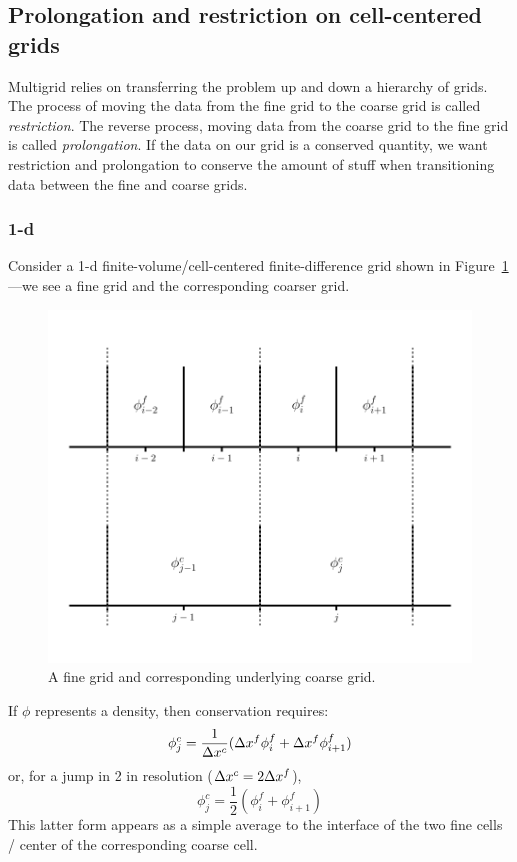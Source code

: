 \subsection{Prolongation and restriction on cell-centered grids}

Multigrid relies on transferring the problem up and down a hierarchy of
grids. 
The process of moving the data from the fine grid to the coarse grid
is called {\em restriction}.  The reverse process, moving data from
the coarse grid to the fine grid is called {\em prolongation}.  If the
data on our grid is a conserved quantity, we want restriction and prolongation to
conserve the amount of stuff when transitioning data between the fine and coarse grids.


\subsubsection{1-d}

Consider a 1-d finite-volume/cell-centered finite-difference grid
shown in Figure~\ref{fig:mg:1dgrid-prolong}---we see a fine grid and the
corresponding coarser grid.
%
\begin{figure}[t]
\centering
\includegraphics[width=0.8\linewidth]{fvrestrict}
\caption[The geometry for 1-d
  prolongation and restriction]{\label{fig:mg:1dgrid-prolong} A fine grid and
  corresponding underlying coarse grid.}
\end{figure}
%
If $\phi$ represents a density, then
conservation requires:
\begin{equation}
\phi^c_j = \frac{1}{\Delta x^c} (\Delta x^f \phi^f_i + \Delta x^f \phi^f_{i+1} )
\end{equation}
or, for a jump in 2 in resolution ($\Delta x^c = 2 \Delta x^f$), 
\begin{equation}
\phi^c_j = \frac{1}{2} (\phi^f_i + \phi^f_{i+1} )
\end{equation}
This latter form appears as a simple average to the interface of the
two fine cells / center of the corresponding coarse cell.

